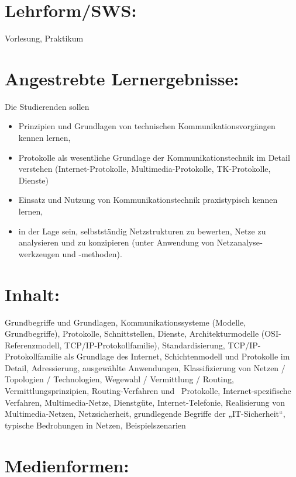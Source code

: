 \section*{Lehrform/SWS:}\label{lehrformsws-12}

Vorlesung, Praktikum

\section*{Angestrebte
Lernergebnisse:}\label{angestrebte-lernergebnisse-12}

Die Studierenden sollen

\begin{itemize}
\item
  Prinzipien und Grundlagen von technischen Kommunikations­vor­gängen
  kennen lernen,
\item
  Protokolle als wesentliche Grundlage der Kommunikationstechnik im
  Detail verstehen (Internet-Protokolle, Multimedia-Protokolle,
  TK-Protokolle, Dienste)
\item
  Einsatz und Nutzung von Kommunikations­tech­nik praxistypisch kennen
  lernen,
\item
  in der Lage sein, selbstständig Netzstrukturen zu bewerten, Netze zu
  analysieren und zu konzipieren (unter Anwendung von
  Netz­analyse­werkzeugen und -methoden).
\end{itemize}

\section*{Inhalt:}\label{inhalt-12}

Grundbegriffe und Grundlagen, Kommunikationssysteme (Modelle,
Grundbegriffe), Protokolle, Schnittstellen, Dienste, Architekturmodelle
(OSI-Referenzmodell, TCP/IP-Protokollfamilie), Standardisierung,
TCP/IP-Protokollfamilie als Grundlage des Internet, Schichtenmodell und
Protokolle im Detail, Adressierung, ausgewählte Anwendungen,
Klassifizierung von Netzen / Topologien / Technologien, Wegewahl /
Vermittlung / Routing, Vermittlungsprinzipien, Routing-Verfahren und~
Protokolle, Internet-spezifische Verfahren, Multimedia-Netze,
Dienstgüte, Internet-Telefonie, Realisierung von Multimedia-Netzen,
Netzsicherheit, grundlegende Begriffe der „IT-Sicherheit``, typische
Bedrohungen in Netzen, Beispielszenarien

\section*{Medienformen:}\label{medienformen-7}


